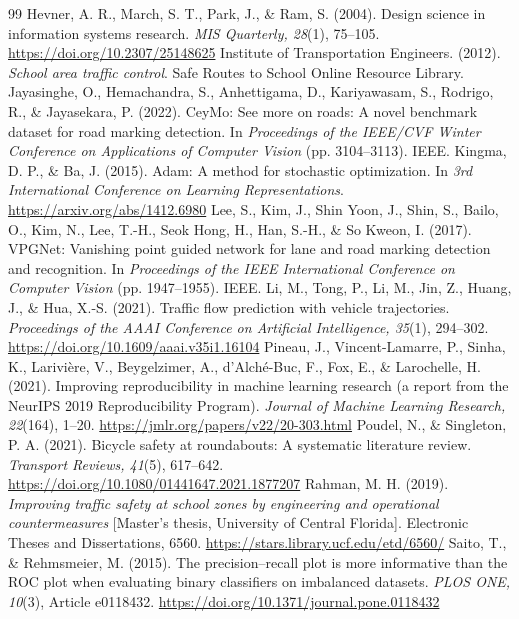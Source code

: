 \documentclass[11pt]{article}
\begin{document}
\begin{thebibliography}{99}
 Hevner, A. R., March, S. T., Park, J., \& Ram, S. (2004). Design science in information systems research. \emph{MIS Quarterly, 28}(1), 75--105. \url{https://doi.org/10.2307/25148625}
 Institute of Transportation Engineers. (2012). \emph{School area traffic control}. Safe Routes to School Online Resource Library.
 Jayasinghe, O., Hemachandra, S., Anhettigama, D., Kariyawasam, S., Rodrigo, R., \& Jayasekara, P. (2022). CeyMo: See more on roads: A novel benchmark dataset for road marking detection. In \emph{Proceedings of the IEEE/CVF Winter Conference on Applications of Computer Vision} (pp. 3104--3113). IEEE.
 Kingma, D. P., \& Ba, J. (2015). Adam: A method for stochastic optimization. In \emph{3rd International Conference on Learning Representations}. \url{https://arxiv.org/abs/1412.6980}
 Lee, S., Kim, J., Shin Yoon, J., Shin, S., Bailo, O., Kim, N., Lee, T.-H., Seok Hong, H., Han, S.-H., \& So Kweon, I. (2017). VPGNet: Vanishing point guided network for lane and road marking detection and recognition. In \emph{Proceedings of the IEEE International Conference on Computer Vision} (pp. 1947--1955). IEEE.
 Li, M., Tong, P., Li, M., Jin, Z., Huang, J., \& Hua, X.-S. (2021). Traffic flow prediction with vehicle trajectories. \emph{Proceedings of the AAAI Conference on Artificial Intelligence, 35}(1), 294--302. \url{https://doi.org/10.1609/aaai.v35i1.16104}
 Pineau, J., Vincent-Lamarre, P., Sinha, K., Larivi{\`e}re, V., Beygelzimer, A., d'Alch{\'e}-Buc, F., Fox, E., \& Larochelle, H. (2021). Improving reproducibility in machine learning research (a report from the NeurIPS 2019 Reproducibility Program). \emph{Journal of Machine Learning Research, 22}(164), 1--20. \url{https://jmlr.org/papers/v22/20-303.html}
 Poudel, N., \& Singleton, P. A. (2021). Bicycle safety at roundabouts: A systematic literature review. \emph{Transport Reviews, 41}(5), 617--642. \url{https://doi.org/10.1080/01441647.2021.1877207}
 Rahman, M. H. (2019). \emph{Improving traffic safety at school zones by engineering and operational countermeasures} [Master's thesis, University of Central Florida]. Electronic Theses and Dissertations, 6560. \url{https://stars.library.ucf.edu/etd/6560/}
 Saito, T., \& Rehmsmeier, M. (2015). The precision--recall plot is more informative than the ROC plot when evaluating binary classifiers on imbalanced datasets. \emph{PLOS ONE, 10}(3), Article e0118432. \url{https://doi.org/10.1371/journal.pone.0118432}

\end{thebibliography}
\end{document}
